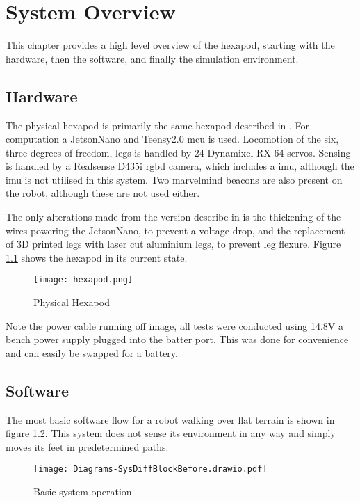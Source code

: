 \chapter{System Overview}
This chapter provides a high level overview of the hexapod, starting with the hardware, then the software, and finally the simulation
environment.
\section{Hardware}
The physical hexapod is primarily the same hexapod described in \cite{erasmus2023guidance}. For computation a JetsonNano and Teensy2.0
\ac{mcu} is used. Locomotion of the six, three degrees of freedom, legs is handled by 24 Dynamixel RX-64 servos. Sensing is handled by
a Realsense D435i \ac{rgbd} camera, which includes a \ac{imu}, although the \ac{imu} is not utilised in this system. Two marvelmind
beacons are also present on the robot, although these are not used either.

The only alterations made from the version describe in \cite{erasmus2023guidance} is the thickening of the wires powering the JetsonNano,
to prevent a voltage drop, and the replacement of 3D printed legs with laser cut aluminium legs, to prevent leg flexure.
Figure \ref{fig:hexapod} shows the hexapod in its current state.
\begin{figure}[h]
    \centering
    \texttt{[image: hexapod.png]}
    \caption{Physical Hexapod}
    \label{fig:hexapod}
\end{figure}

\noindent
Note the power cable running off image, all tests were conducted using 14.8V
a bench power supply plugged into the batter port. This was done for convenience and can easily be swapped for a battery.

\section{Software}
The most basic software flow for a robot walking over flat terrain is shown in figure \ref{fig:basic_sys}. This system does not sense
its environment in any way and simply moves its feet in predetermined paths.
\begin{figure}[h]
    \centering
    \texttt{[image: Diagrams-SysDiffBlockBefore.drawio.pdf]}
    \caption{Basic system operation}
    \label{fig:basic_sys}
\end{figure}

